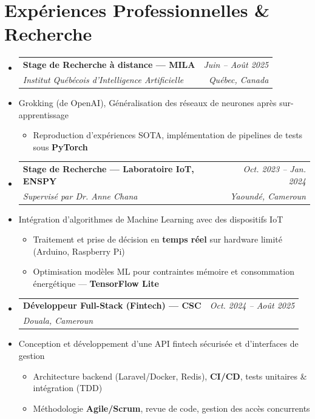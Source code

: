 \documentclass[a4paper,11pt]{article}
\makeatletter
\newcommand{\resumeItem}[1]{\item\small{#1}}
\newcommand{\resumeSubheading}[4]{
  \vspace{-1pt}\item
    \begin{tabular*}{0.97\textwidth}[t]{l@{\extracolsep{\fill}}r}
      \textbf{#1} & \textit{\small #2} \\
      \textit{\small #3} & \textit{\small #4} \\
    \end{tabular*}\vspace{-5pt}
}
\makeatother
\begin{document}
\section{Expériences Professionnelles \& Recherche}
\begin{itemize}[leftmargin=*, label={}]

    \resumeSubheading
      {Stage de Recherche à distance — MILA}{Juin -- Août 2025}
      {Institut Québécois d'Intelligence Artificielle}{Québec, Canada}
      \resumeItem{Grokking (de OpenAI), Généralisation des réseaux de neurones après sur-apprentissage}
      \begin{itemize}[leftmargin=0.4cm, nosep, label=\tiny$\bullet$]
        \item \small{Reproduction d'expériences SOTA, implémentation de pipelines de tests sous \textbf{PyTorch}}
      \end{itemize}
    \vspace{2pt}

    \resumeSubheading
      {Stage de Recherche — Laboratoire IoT, ENSPY}{Oct. 2023 -- Jan. 2024}
      {Supervisé par Dr. Anne Chana}{Yaoundé, Cameroun}
      \resumeItem{Intégration d'algorithmes de Machine Learning avec des dispositifs IoT}
      \begin{itemize}[leftmargin=0.4cm, nosep, label=\tiny$\bullet$]
        \item \small{Traitement et prise de décision en \textbf{temps réel} sur hardware limité (Arduino, Raspberry Pi)}
        \item \small{Optimisation modèles ML pour contraintes mémoire et consommation énergétique — \textbf{TensorFlow Lite}}
      \end{itemize}
    \vspace{2pt}

    \resumeSubheading
      {Développeur Full-Stack (Fintech) — CSC}{Oct. 2024 -- Août 2025}
      {Douala, Cameroun}{}
      \resumeItem{Conception et développement d'une API fintech sécurisée et d'interfaces de gestion}
      \begin{itemize}[leftmargin=0.4cm, nosep, label=\tiny$\bullet$]
        \item \small{Architecture backend (Laravel/Docker, Redis), \textbf{CI/CD}, tests unitaires \& intégration (TDD)}
        \item \small{Méthodologie \textbf{Agile/Scrum}, revue de code, gestion des accès concurrents}
      \end{itemize}

\end{itemize}
\end{document}
